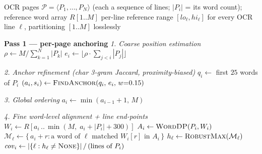 
\begin{algorithm}[htbp]
  \caption{Transcription alignment of OCR pages to the reference text.}
  \label{alg:transcription-alignment}
  \begin{algorithmic}[1]
    \Require OCR pages $\mathcal{P} = \langle P_1, \dots, P_N \rangle$ (each a sequence of
             lines; $|P_i|$ = its word count); reference word array $R[1..M]$
    \Ensure  per-line reference range $[\mathit{lo}_\ell, \mathit{hi}_\ell]$ for every OCR
             line $\ell$, partitioning $[1..M]$ losslessly

    \Statex \textbf{Pass 1 --- per-page anchoring}
    \Statex \textit{1. Coarse position estimation}
    \State $\rho \gets M / \sum_{k=1}^{N} |P_k|$ 
      \State $e_i \gets \big\lfloor \rho \cdot \sum_{j<i} |P_j| \big\rfloor$
    \EndFor

    \Statex \textit{2. Anchor refinement (char 3-gram Jaccard, proximity-biased)}
      \State $q_i \gets$ first $25$ words of $P_i$
      \State $(a_i, s_i) \gets \textsc{FindAnchor}(q_i,\, e_i,\, w{=}0.15)$
    \EndFor

    \Statex \textit{3. Global ordering}
       \State $a_i \gets \min(a_{i-1} + 1,\, M)$
           \EndIf
    \EndFor

    \Statex \textit{4. Fine word-level alignment + line end-points}
      \State $W_i \gets R[a_i \,..\, \min(M,\; a_i + |P_i| + 300)]$
      \State $A_i \gets \textsc{WordDP}(P_i, W_i)$
        \State $\mathcal{M}_\ell \gets \{\, a_i + r : \text{a word of } \ell \text{ matched }
               W_i[r] \text{ in } A_i \,\}$
        \State $h_\ell \gets \textsc{RobustMax}(\mathcal{M}_\ell)$
      \EndFor
      \State $\mathit{cov}_i \gets |\{\ell : h_\ell \neq \textsc{None}\}| \,/\, (\text{lines of } P_i)$
    \EndFor


\end{algorithmic}
\end{algorithm}
